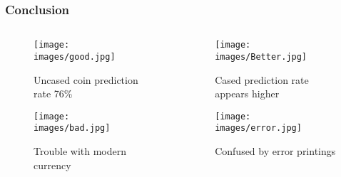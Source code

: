 \documentclass[11pt]{beamer}
\begin{document}
\begin{frame}
	\frametitle{Conclusion}
	\begin{columns}[onlytextwidth]
		\begin{column}{.5\textwidth}
			\begin{figure}
				\texttt{[image: images/good.jpg]}
				\label{fig:good}
				\caption{Uncased coin prediction rate 76\%}
			\end{figure}
			\begin{figure}
				\texttt{[image: images/bad.jpg]}
				\label{fig:ok}
				\caption{Trouble with modern currency}
			\end{figure}
		\end{column}
		\begin{column}{.5\textwidth}
			\begin{figure}
				\texttt{[image: images/Better.jpg]}
				\label{fig:bad}
				\caption{Cased prediction rate appears higher}
			\end{figure}
			\begin{figure}
				\texttt{[image: images/error.jpg]}
				\label{fig:cond3}
				\caption{Confused by error printings}
			\end{figure}
		\end{column}
	\end{columns}
\end{frame}
\begin{frame}
	\titlepage
\end{frame}
\end{document}
